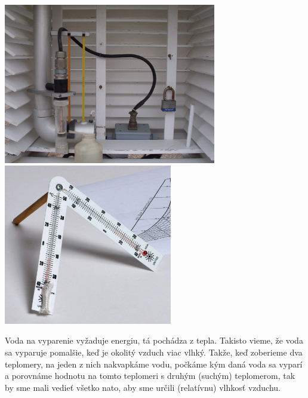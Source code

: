 \documentclass[11pt]{extarticle}
\begin{document}
\begin{center}
	\includegraphics[height=7cm]{stevenson-screen-interior}
	\includegraphics[height=7cm]{sling-psychrometer}
\end{center}

Voda na vyparenie vyžaduje energiu, tá pochádza z tepla. Takisto vieme, že voda sa vyparuje pomalšie, keď je okolitý vzduch viac vlhký.
Takže, keď zoberieme dva teplomery, na jeden z nich nakvapkáme vodu, počkáme kým daná voda sa vyparí a porovnáme hodnotu na tomto teplomeri s druhým (suchým) teplomerom, tak by sme mali vedieť všetko nato, aby sme určili (relatívnu) vlhkosť vzduchu.
\end{document}
